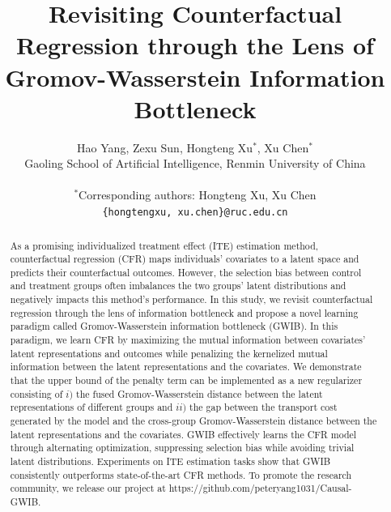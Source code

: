 \documentclass{article}
\title{Revisiting Counterfactual Regression through the Lens of Gromov-Wasserstein Information Bottleneck}
\author{Hao Yang, Zexu Sun, Hongteng Xu$^*$, Xu Chen$^*$ \\
        \small Gaoling School of Artificial Intelligence, Renmin University of China \\\\
        \small $^{*}$Corresponding authors: Hongteng Xu, Xu Chen\\\small  \tt{\{hongtengxu, xu.chen\}@ruc.edu.cn} \\
}
\date{}
\begin{document}
\maketitle
\begin{abstract} 

As a promising individualized treatment effect (ITE) estimation method, counterfactual regression (CFR) maps individuals' covariates to a latent space and predicts their counterfactual outcomes. 
However, the selection bias between control and treatment groups often imbalances the two groups' latent distributions and negatively impacts this method's performance.
In this study, we revisit counterfactual regression through the lens of information bottleneck and propose a novel learning paradigm called Gromov-Wasserstein information bottleneck (GWIB).
In this paradigm, we learn CFR by maximizing the mutual information between covariates' latent representations and outcomes while penalizing the kernelized mutual information between the latent representations and the covariates.
We demonstrate that the upper bound of the penalty term can be implemented as a new regularizer consisting of $i)$ the fused Gromov-Wasserstein distance between the latent representations of different groups and $ii)$ the gap between the transport cost generated by the model and the cross-group Gromov-Wasserstein distance between the latent representations and the covariates. 
GWIB effectively learns the CFR model through alternating optimization, suppressing selection bias while avoiding trivial latent distributions. 
Experiments on ITE estimation tasks show that GWIB consistently outperforms state-of-the-art CFR methods.
To promote the research community, we release our project at https://github.com/peteryang1031/Causal-GWIB.
\end{abstract}

\noindent{}\\
\end{document}
